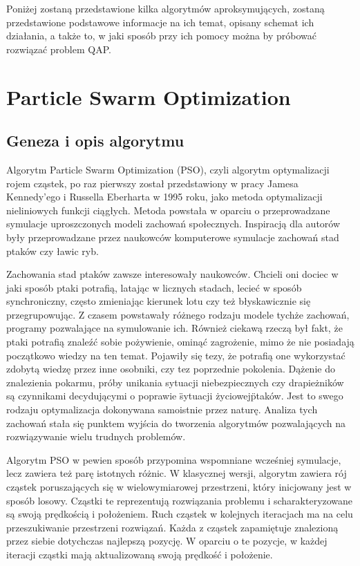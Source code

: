 Poniżej zostaną przedstawione kilka algorytmów aproksymujących, zostaną przedstawione podstawowe informacje na ich temat, opisany schemat ich działania, a także to, w jaki sposób przy ich pomocy można by próbować rozwiązać problem QAP.
\section{Particle Swarm Optimization}
\label{sec:PSO}
\subsection{Geneza i opis algorytmu}
Algorytm Particle Swarm Optimization (PSO), czyli algorytm optymalizacji rojem cząstek, po raz pierwszy został przedstawiony w pracy Jamesa Kennedy'ego i Russella Eberharta w 1995 roku, jako metoda optymalizacji nieliniowych funkcji ciągłych. Metoda powstała w oparciu o przeprowadzane symulacje uproszczonych modeli zachowań społecznych. Inspiracją dla autorów były przeprowadzane przez naukowców komputerowe symulacje zachowań stad ptaków czy ławic ryb.

Zachowania stad ptaków zawsze interesowały naukowców. Chcieli oni dociec w jaki sposób ptaki potrafią, latając w licznych stadach, lecieć w sposób synchroniczny, często zmieniając kierunek lotu czy też błyskawicznie się przegrupowując. Z czasem powstawały różnego rodzaju modele tychże zachowań, programy pozwalające na symulowanie ich. Również ciekawą rzeczą był fakt, że ptaki potrafią znaleźć sobie pożywienie, ominąć zagrożenie, mimo że nie posiadają początkowo wiedzy na ten temat. Pojawiły się tezy, że potrafią one wykorzystać zdobytą wiedzę przez inne osobniki, czy tez poprzednie pokolenia. Dążenie do znalezienia pokarmu, próby unikania sytuacji niebezpiecznych czy drapieżników są czynnikami decydującymi o poprawie \"sytuacji życiowej\" ptaków. Jest to swego rodzaju optymalizacja dokonywana samoistnie przez naturę. Analiza tych zachowań stała się punktem wyjścia do tworzenia algorytmów pozwalających na rozwiązywanie wielu trudnych problemów.

Algorytm PSO w pewien sposób przypomina wspomniane wcześniej symulacje, lecz zawiera też parę istotnych różnic. W klasycznej wersji, algorytm zawiera rój cząstek poruszających się w wielowymiarowej przestrzeni, który inicjowany jest w sposób losowy. Cząstki te reprezentują rozwiązania problemu i scharakteryzowane są swoją prędkością i położeniem. Ruch cząstek w kolejnych iteracjach ma na celu przeszukiwanie przestrzeni rozwiązań. Każda z cząstek zapamiętuje znalezioną przez siebie dotychczas najlepszą pozycję. W oparciu o te pozycje, w każdej iteracji cząstki mają aktualizowaną swoją prędkość i położenie.

